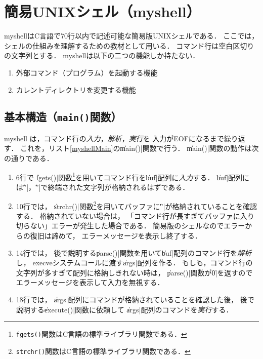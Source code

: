 \section{簡易UNIXシェル（myshell）}
myshellはC言語で70行以内で記述可能な簡易版UNIXシェルである．
ここでは，シェルの仕組みを理解するための教材として用いる．
コマンド行は空白区切りの文字列とする．
myshellは以下の二つの機能しか持たない．

\begin{enumerate}
\item 外部コマンド（プログラム）を起動する機能
\item カレントディレクトリを変更する機能
\end{enumerate}

\subsection{基本構造（\texttt{main()}関数）}
myshell は，コマンド行の\emph{入力}，\emph{解析}，\emph{実行}を
入力がEOFになるまで繰り返す．
これを，リスト\ref{myshellMain}の\|main()|関数で行う．
\|main()|関数の動作は次の通りである．



\begin{enumerate}
\item 6行で
  \|fgets()|関数\footnote{
    \texttt{fgets()}関数はC言語の標準ライブラリ関数である．
  }を用いてコマンド行を\|buf|配列に\emph{入力}する．
  \|buf|配列には\|'\n'|，\|'\0'|で終端された文字列が格納されるはずである．
\item 10行では，
  \|strchr()|関数\footnote{
    \texttt{strchr()}関数はC言語の標準ライブラリ関数である．
  }を用いてバッファに\|'\n'|が格納されていることを確認する．
  格納されていない場合は，
  「コマンド行が長すぎてバッファに入り切らない」エラーが発生した場合である．
  簡易版のシェルなのでエラーからの復旧は諦めて，
  エラーメッセージを表示し終了する．
\item 14行では，
  後で説明する\|parse()|関数を用いて\|buf|配列のコマンド行を\emph{解析}し，
  execveシステムコールに渡す\|args|配列を作る．
  もしも，コマンド行の文字列が多すぎて配列に格納しきれない時は，
  \|parse()|関数が\|0|を返すのでエラーメッセージを表示して入力を無視する．
\item 18行では，
  \|args|配列にコマンドが格納されていることを確認した後，
  後で説明する\|execute()|関数に依頼して
  \|args|配列のコマンドを\emph{実行}する．
\end{enumerate}

